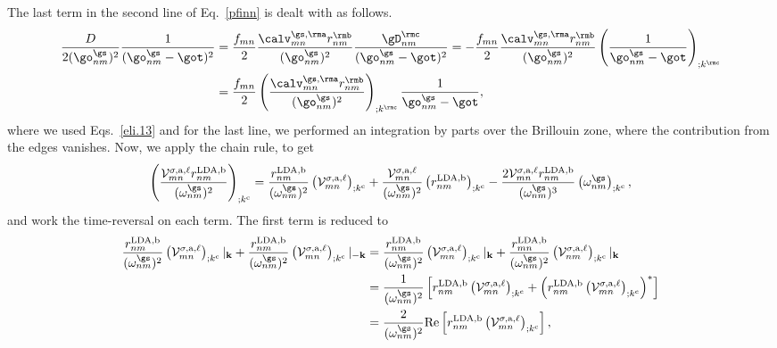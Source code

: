The last term in the second line of Eq.~\eqref{pfinn} is dealt with as
follows.
\begin{align}\label{dresn}
\frac{D}{2(\go^\gs_{nm})^2}\frac{1}{(\go^\gs_{nm}-\got)^2}
&=
\frac{f_{mn}}{2}\frac{\calv^{\gs,\rma}_{mn}r^{\rmb}_{nm}}{(\go^\gs_{nm})^2}
\frac{\gD^{\rmc}_{nm}}{(\go^\gs_{nm}-\got)^2} 
=
-
\frac{f_{mn}}{2}
\frac{\calv^{\gs,\rma}_{mn}r^{\rmb}_{nm}}{(\go^\gs_{nm})^2}
\left(
\frac{1}{\go^\gs_{nm}-\got}
\right)_{;k^{\rmc}}
\nonumber\\
&=
\frac{f_{mn}}{2}
\left(
\frac{\calv^{\gs,\rma}_{mn}r^{\rmb}_{nm}}{(\go^\gs_{nm})^2}
\right)_{;k^{\rmc}}
\frac{1}{\go^\gs_{nm}-\got}
,
\end{align} 
where we used Eqs.~\eqref{eli.13}  and for the last
line, we performed an
integration by parts over the Brillouin zone,
where the contribution from the edges vanishes.\cite{ashcroft_solid_1976}
Now, we apply the chain rule, to get
\begin{equation}\label{chr}
    \left(\frac{\mathcal{V}^{\sigma,\text{a},\ell}_{mn}r^{\text{LDA,b}}_{nm}}
    {(\omega^{\gs}_{nm})^2}\right)_{;k^{\text{c}}}
=   \frac{r^{\text{LDA,b}}_{nm}}{(\omega^{\gs}_{nm})^2}
    \left(\mathcal{V}^{\sigma,\text{a},\ell}_{mn}\right)_{;k^{\text{c}}}
+   \frac{\mathcal{V}^{\sigma,\text{a},\ell}_{mn}}{(\omega^{\gs}_{nm})^2}
    \left(r^{\text{LDA,b}}_{nm}\right)_{;k^{\text{c}}}
-   \frac{2\mathcal{V}^{\sigma,\text{a},\ell}_{mn}
    r^{\text{LDA,b}}_{nm}}{(\omega^{\gs}_{nm})^3}
    \left(\omega^{\gs}_{nm}\right)_{;k^{\text{c}}}
,
\end{equation}
and work the time-reversal on each term.
The first term is reduced to
\begin{align}\label{first_term_gen_deriv}
    \frac{r^{\text{LDA,b}}_{nm}}{(\omega^{\gs}_{nm})^{2}}
    \left(\mathcal{V}^{\sigma,\text{a},\ell}_{mn}\right)
    _{;k^{\text{c}}}|_{\mathbf{k}}
+   \frac{r^{\text{LDA,b}}_{nm}}{(\omega^{\gs}_{nm})^{2}}
    \left(\mathcal{V}^{\sigma,\text{a},\ell}_{mn}\right)
    _{;k^{\text{c}}}|_{-\mathbf{k}}
&=  \frac{r^{\text{LDA,b}}_{nm}}{(\omega^{\gs}_{nm})^{2}}
    \left(\mathcal{V}^{\sigma,\text{a},\ell}_{mn}\right)
    _{;k^{\text{c}}}|_{\mathbf{k}}
+   \frac{r^{\text{LDA,b}}_{mn}}{(\omega^{\gs}_{nm})^{2}}
    \left(\mathcal{V}^{\sigma,\text{a},\ell}_{nm}\right)
    _{;k^{\text{c}}}|_{\mathbf{k}}\nonumber\\
&=  \frac{1}{(\omega^{\gs}_{nm})^{2}}\left[r^{\text{LDA,b}}_{nm}
    \left(\mathcal{V}^{\sigma,\text{a},\ell}_{mn}\right)
    _{;k^{\text{c}}}
+   \left(r^{\text{LDA,b}}_{nm}
    \left(\mathcal{V}^{\sigma,\text{a},\ell}_{mn}\right)
    _{;k^{\text{c}}}\right)^*\right]\nonumber\\
&=  \frac{2}{(\omega^{\gs}_{nm})^{2}}\mathrm{Re}\left[r^{\text{LDA,b}}_{nm}
    \left(\mathcal{V}^{\sigma,\text{a},\ell}_{mn}\right)_{;k^{\text{c}}}\right]
,
\end{align}

